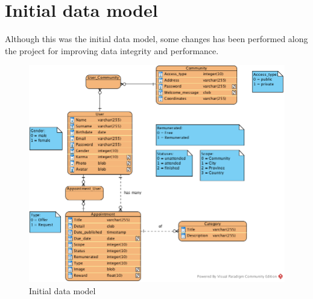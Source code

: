\documentclass{DeustoFDP}
\begin{document}
\chapter{Initial data model}
Although this was the initial data model, some changes has been performed along the project for improving data integrity and performance.
\begin{figure}[h]
\centering
\includegraphics[width=0.7\linewidth]{fig/Database}
\caption[Initial data model]{Initial data model}
\label{fig:Database}
\end{figure}


\backmatter
\end{document}

